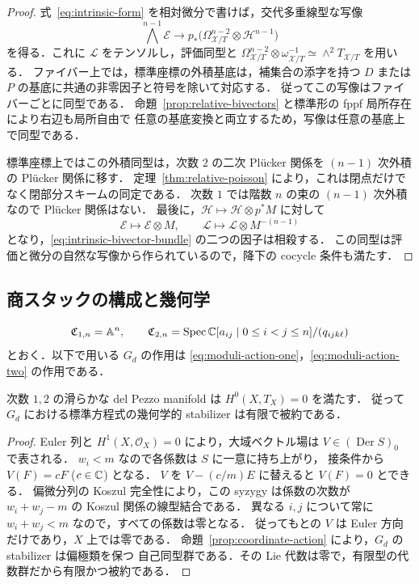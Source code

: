 \begin{proof}
式~\eqref{eq:intrinsic-form} を相対微分で書けば，交代多重線型な写像
\[
 \bigwedge^{n-1}\mathcal E
 \longrightarrow
 p_*\bigl(\Omega_{\mathcal X/T}^{n-2}\otimes\mathcal H^{n-1}\bigr)
\]
を得る．これに $\mathcal L$ をテンソルし，評価同型と
$\Omega_{\mathcal X/T}^{n-2}\otimes\omega_{\mathcal X/T}^{-1}
\simeq\wedge^2T_{\mathcal X/T}$ を用いる．
ファイバー上では，標準座標の外積基底は，補集合の添字を持つ
$D$ または $P$ の基底に共通の非零因子と符号を除いて対応する．
従ってこの写像はファイバーごとに同型である．
命題~\ref{prop:relative-bivectors} と標準形の fppf 局所存在により右辺も局所自由で
任意の基底変換と両立するため，写像は任意の基底上で同型である．

標準座標上ではこの外積同型は，次数 $2$ の二次 Pl\"ucker 関係を
$(n-1)$ 次外積の Pl\"ucker 関係に移す．
定理~\ref{thm:relative-poisson} により，これは閉点だけでなく閉部分スキームの同定である．
次数 $1$ では階数 $n$ の束の $(n-1)$ 次外積なので Pl\"ucker 関係はない．
最後に，$\mathcal H\mapsto\mathcal H\otimes p^*M$ に対して
\[
 \mathcal E\mapsto\mathcal E\otimes M,
 \qquad \mathcal L\mapsto\mathcal L\otimes M^{-(n-1)}
\]
となり，\eqref{eq:intrinsic-bivector-bundle} の二つの因子は相殺する．
この同型は評価と微分の自然な写像から作られているので，降下の cocycle 条件も満たす．
\end{proof}

\subsection{商スタックの構成と幾何学}

\[
 \mathfrak C_{1,n}=\mathbb A^n,\qquad
 \mathfrak C_{2,n}=\operatorname{Spec}
 \mathbb C[a_{ij}\mid0\leq i<j\leq n]/(q_{ijk\ell})
\]
とおく．以下で用いる $G_d$ の作用は
\eqref{eq:moduli-action-one}，\eqref{eq:moduli-action-two} の作用である．

\begin{lemma}[無限小自己同型の消滅]
\label{lemma:no-vector-fields}
次数 $1,2$ の滑らかな del Pezzo manifold は $H^0(X,T_X)=0$ を満たす．
従って $G_d$ における標準方程式の幾何学的 stabilizer は有限で被約である．
\end{lemma}

\begin{proof}
Euler 列と $H^1(X,\mathcal O_X)=0$ により，大域ベクトル場は
$V\in(\operatorname{Der}S)_0$ で表される．
$w_i<m$ なので各係数は $S$ に一意に持ち上がり，
接条件から $V(F)=cF$ ($c\in\mathbb C$) となる．
$V$ を $V-(c/m)E$ に替えると $V(F)=0$ とできる．
偏微分列の Koszul 完全性により，この syzygy は係数の次数が
$w_i+w_j-m$ の Koszul 関係の線型結合である．
異なる $i,j$ について常に $w_i+w_j<m$ なので，すべての係数は零となる．
従ってもとの $V$ は Euler 方向だけであり，$X$ 上では零である．
命題~\ref{prop:coordinate-action} により，$G_d$ の stabilizer は偏極類を保つ
自己同型群である．その Lie 代数は零で，有限型の代数群だから有限かつ被約である．
\end{proof}

